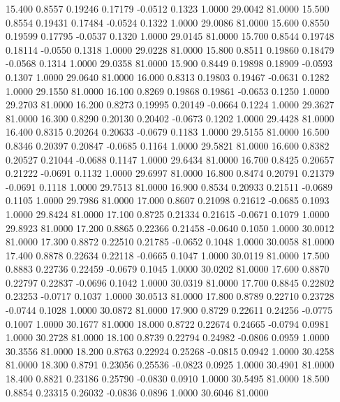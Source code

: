   15.400   0.8557   0.19246   0.17179  -0.0512   0.1323   1.0000  29.0042  81.0000
  15.500   0.8554   0.19431   0.17484  -0.0524   0.1322   1.0000  29.0086  81.0000
  15.600   0.8550   0.19599   0.17795  -0.0537   0.1320   1.0000  29.0145  81.0000
  15.700   0.8544   0.19748   0.18114  -0.0550   0.1318   1.0000  29.0228  81.0000
  15.800   0.8511   0.19860   0.18479  -0.0568   0.1314   1.0000  29.0358  81.0000
  15.900   0.8449   0.19898   0.18909  -0.0593   0.1307   1.0000  29.0640  81.0000
  16.000   0.8313   0.19803   0.19467  -0.0631   0.1282   1.0000  29.1550  81.0000
  16.100   0.8269   0.19868   0.19861  -0.0653   0.1250   1.0000  29.2703  81.0000
  16.200   0.8273   0.19995   0.20149  -0.0664   0.1224   1.0000  29.3627  81.0000
  16.300   0.8290   0.20130   0.20402  -0.0673   0.1202   1.0000  29.4428  81.0000
  16.400   0.8315   0.20264   0.20633  -0.0679   0.1183   1.0000  29.5155  81.0000
  16.500   0.8346   0.20397   0.20847  -0.0685   0.1164   1.0000  29.5821  81.0000
  16.600   0.8382   0.20527   0.21044  -0.0688   0.1147   1.0000  29.6434  81.0000
  16.700   0.8425   0.20657   0.21222  -0.0691   0.1132   1.0000  29.6997  81.0000
  16.800   0.8474   0.20791   0.21379  -0.0691   0.1118   1.0000  29.7513  81.0000
  16.900   0.8534   0.20933   0.21511  -0.0689   0.1105   1.0000  29.7986  81.0000
  17.000   0.8607   0.21098   0.21612  -0.0685   0.1093   1.0000  29.8424  81.0000
  17.100   0.8725   0.21334   0.21615  -0.0671   0.1079   1.0000  29.8923  81.0000
  17.200   0.8865   0.22366   0.21458  -0.0640   0.1050   1.0000  30.0012  81.0000
  17.300   0.8872   0.22510   0.21785  -0.0652   0.1048   1.0000  30.0058  81.0000
  17.400   0.8878   0.22634   0.22118  -0.0665   0.1047   1.0000  30.0119  81.0000
  17.500   0.8883   0.22736   0.22459  -0.0679   0.1045   1.0000  30.0202  81.0000
  17.600   0.8870   0.22797   0.22837  -0.0696   0.1042   1.0000  30.0319  81.0000
  17.700   0.8845   0.22802   0.23253  -0.0717   0.1037   1.0000  30.0513  81.0000
  17.800   0.8789   0.22710   0.23728  -0.0744   0.1028   1.0000  30.0872  81.0000
  17.900   0.8729   0.22611   0.24256  -0.0775   0.1007   1.0000  30.1677  81.0000
  18.000   0.8722   0.22674   0.24665  -0.0794   0.0981   1.0000  30.2728  81.0000
  18.100   0.8739   0.22794   0.24982  -0.0806   0.0959   1.0000  30.3556  81.0000
  18.200   0.8763   0.22924   0.25268  -0.0815   0.0942   1.0000  30.4258  81.0000
  18.300   0.8791   0.23056   0.25536  -0.0823   0.0925   1.0000  30.4901  81.0000
  18.400   0.8821   0.23186   0.25790  -0.0830   0.0910   1.0000  30.5495  81.0000
  18.500   0.8854   0.23315   0.26032  -0.0836   0.0896   1.0000  30.6046  81.0000
